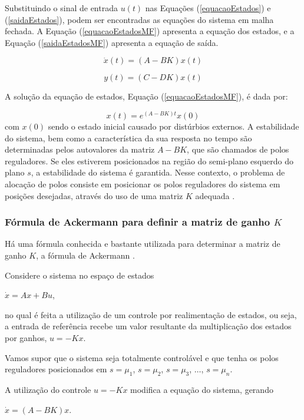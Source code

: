 \documentclass[journal,brazil,english]{IEEEtran}
\begin{document}
Substituindo o sinal de entrada $u(t)$ nas Equações (\ref{equacaoEstados}) e (\ref{saidaEstados}), podem ser encontradas as equações do sistema em malha fechada. A Equação (\ref{equacaoEstadosMF}) apresenta a equação dos estados, e a Equação (\ref{saidaEstadosMF}) apresenta a equação de saída.

\begin{equation}\label{equacaoEstadosMF}
\dot{x}(t) = (A-BK)x(t)
\end{equation}

\begin{equation}\label{saidaEstadosMF}
y(t)=(C-DK)x(t)
\end{equation}

A solução da equação de estados, Equação (\ref{equacaoEstadosMF}), é dada por:

\begin{equation}\label{solucaoEE}
x(t) = e^{(A-BK)t}x(0)
\end{equation}
com $x(0)$ sendo o estado inicial causado por distúrbios externos. A estabilidade do sistema, bem como a característica da sua resposta no tempo são determinadas pelos autovalores da matriz $A-BK$, que são chamados de polos reguladores. Se eles estiverem posicionados na região do semi-plano esquerdo do plano $s$, a estabilidade do sistema é garantida. Nesse contexto, o problema de alocação de polos consiste em posicionar os polos reguladores do sistema em posições desejadas, através do uso de uma matriz $K$ adequada \cite{ogata}.

\subsubsection{Fórmula de Ackermann para definir a matriz de ganho $K$}
Há uma fórmula conhecida e bastante utilizada para determinar a matriz de ganho $K$, a fórmula de Ackermann \cite{ogata}.

Considere o sistema no espaço de estados
\begin{center}
$\dot{x}=Ax+Bu$,
\end{center}
no qual é feita a utilização de um controle por realimentação de estados, ou seja, a entrada de referência recebe um valor resultante da multiplicação dos estados por ganhos, $u=-Kx$.

Vamos supor que o sistema seja totalmente controlável e que tenha os polos reguladores posicionados em $s=\mu _1$, $s=\mu _2$, $s=\mu _3$, $\ldots$, $s=\mu _n$.

A utilização do controle $u=-Kx$ modifica a equação do sistema, gerando
\begin{center}
$\dot{x}=(A-BK)x$.
\end{center}
\end{document}

